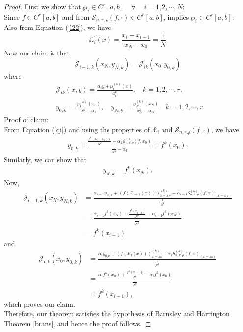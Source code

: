 \documentclass{article}[12pt, a4]
\begin{document}
	\begin{proof}
		First we show that $\wp_{i}\in C^r[a,b]\quad \forall~ \quad i =1,2,\cdots,N$:\\
		Since $f \in C^r[a,b]$ and from \cite{QIAN2022126781} $\mathcal{S}_{n,r,\rho}(f,\cdot) \in C^r[a,b]$, implies $\wp_{i} \in C^r[a,b]$.\\
		Also from Equation (\ref{l22}), we have
		\begin{equation*}
			\pounds^{\prime}_i(x)= \frac{x_i -x_{i-1}}{x_N-x_0}=\frac{1}{N}
		\end{equation*} 
		Now our claim is that
		\begin{equation*}
			\mathcal{J}_{i-1, k}\left(x_N, y_{N, k}\right) = \mathcal{J}_{i k}\left(x_0, y_{0, k}\right)
		\end{equation*}
		where 
		\begin{align*}  
			&\mathcal{J}_{i k}(x, y) = \frac{\alpha_i y + \wp_{i}^{(k)}(x)}{a_i^k}, \quad k=1,2,\cdots,r, \\  
			&y_{0, k} = \frac{\wp_1^{(k)}\left(x_0\right)}{a_1^k - \alpha_1}, \quad y_{N, k} = \frac{\wp_N^{(k)}\left(x_N\right)}{a_N^k - \alpha_N} \quad  k=1,2,\cdots,r .  
		\end{align*} 
		Proof of claim:\\
		From Equation (\ref{qi}) and using the properties of $\pounds_i$ and $\mathcal{S}_{n,r.\rho}(f,\cdot)$, we have 
		\begin{align*}
			y_{0, k}=\frac{\frac{f^{k}(\pounds_1(x_0))}{N^k}-\alpha_{1}\mathcal{S}^{(k)}_{n,r.\rho}(f,x_0)}{\frac{1}{N^k}-\alpha_{1}}=f^k(x_0).
		\end{align*}
		Similarly, we can show that
		\begin{align*}
			y_{N, k}=f^k(x_N).
		\end{align*}
		Now, 
		\begin{align*}
			\mathcal{J}_{i-1, k}\left(x_N, y_{N, k}\right) &= \frac{\alpha_{i-1} y_{N,k} + (f(\pounds_{i-1}(x)))_{x=x_N}^{(k)}-\alpha_{i-1}S^{(k)}_{n,r,\rho}(f, x)_{(x=x_N)}}{\frac{1}{N^k}}\\
			&=\frac{\alpha_{i-1} f^k(x_N) + \frac{f^k(x_{i-1})}{N^k}-\alpha_{i-1}f^k(x_N)}{\frac{1}{N^k}}\\
			&=f^k(x_{i-1})
		\end{align*}
		and
		\begin{align*}
			\mathcal{J}_{i, k}\left(x_0, y_{0, k}\right) &= \frac{\alpha_{i} y_{0,k} + (f(\pounds_{i}(x)))_{x=x_0}^{(k)}-\alpha_{i}S^{(k)}_{n,r,\rho}(f, x)_{(x=x_0)}}{\frac{1}{N^k}}\\
			&=\frac{\alpha_{i} f^k(x_0) + \frac{f^k(x_{i-1})}{N^k}-\alpha_{i}f^k(x_0)}{\frac{1}{N^k}}\\
			&=f^k(x_{i-1}),
		\end{align*}
		which proves our claim.
		\\
		Therefore, our theorem satisfies the hypothesis of Barnsley and Harrington Theorem \ref{brans}, and hence the proof follows.
		
	\end{proof}
	
\end{document}
